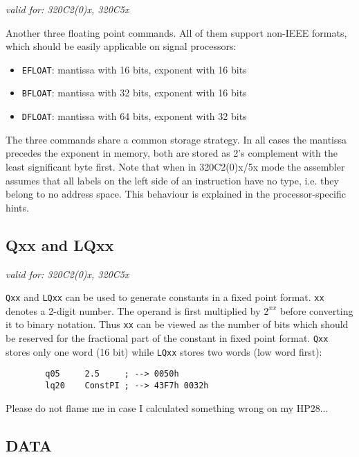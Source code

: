 \documentclass[12pt,twoside]{report}
\makeatletter
\newcommand{\tty}[1]{{\tt #1}}
\newcommand{\ttindex}[1]{\index{#1@{\tt #1}}}
\makeatother
\begin{document}
{\em valid for: 320C2(0)x, 320C5x}

Another three floating point commands.  All of them support non-IEEE
formats, which should be easily applicable on signal processors:
\begin{itemize}
\item{\tty{EFLOAT}: mantissa with 16 bits, exponent with 16 bits}
\item{\tty{BFLOAT}: mantissa with 32 bits, exponent with 16 bits}
\item{\tty{DFLOAT}: mantissa with 64 bits, exponent with 32 bits}
\end{itemize}
The three commands share a common storage strategy.  In all cases the
mantissa precedes the exponent in memory, both are stored as 2's
complement with the least significant byte first.  Note that when in
320C2(0)x/5x mode the assembler assumes that all labels on the left side
of an instruction have no type, i.e.  they belong to no address
space. This behaviour is explained in the processor-specific hints.


\subsection{Qxx and LQxx}
\ttindex{Qxx}\ttindex{LQxx}

{\em valid for: 320C2(0)x, 320C5x}

\tty{Qxx} and \tty{LQxx} can be used to generate constants in a fixed
point format. \tty{xx} denotes a 2-digit number.  The operand is first
multiplied by $2^{xx}$ before converting it to binary notation.  Thus
\tty{xx} can be viewed as the number of bits which should be reserved for
the fractional part of the constant in fixed point format.  \tty{Qxx}
stores only one word (16 bit) while \tty{LQxx} stores two words (low word
first):
\begin{verbatim}
        q05     2.5     ; --> 0050h
        lq20    ConstPI ; --> 43F7h 0032h
\end{verbatim}
Please do not flame me in case I calculated something wrong on my
HP28...


\subsection{DATA}
\ttindex{DATA}
\end{document}

